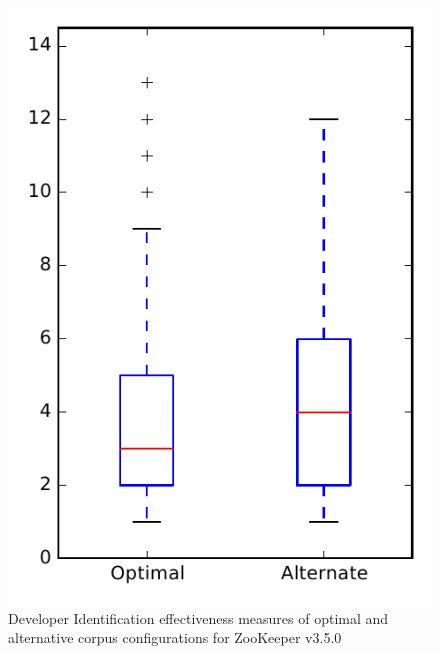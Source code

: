 
\begin{figure}
\centering
\includegraphics[height=0.4\textheight]{figures/combo/dit_rq2_zookeeper}
\caption{Developer Identification effectiveness measures of optimal and alternative corpus configurations for ZooKeeper v3.5.0}
\label{fig:combo:dit:rq2:zookeeper}
\end{figure}
